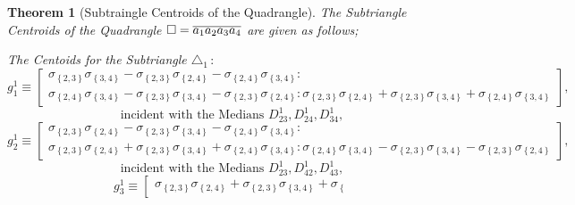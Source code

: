 \documentclass{unswthesis}
\newtheorem{theorem}{Theorem}
\begin{document}
\begin{theorem}[Subtraingle Centroids of the Quadrangle]
The Subtriangle Centroids of the Quadrangle $\square =\overline{%
a_{1}a_{2}a_{3}a_{4}}$ are given as follows;

The Centoids for the Subtriangle $\triangle _{1}\,:$%
\begin{equation*}
g_{1}^{1}\equiv \left[ 
\begin{array}{c}
\sigma _{\left\{ 2,3\right\} }\sigma _{\left\{ 3,4\right\} }-\sigma
_{\left\{ 2,3\right\} }\sigma _{\left\{ 2,4\right\} }-\sigma _{\left\{
2,4\right\} }\sigma _{\left\{ 3,4\right\} }: \\ 
\sigma _{\left\{ 2,4\right\} }\sigma _{\left\{ 3,4\right\} }-\sigma
_{\left\{ 2,3\right\} }\sigma _{\left\{ 3,4\right\} }-\sigma _{\left\{
2,3\right\} }\sigma _{\left\{ 2,4\right\} }:\sigma _{\left\{ 2,3\right\}
}\sigma _{\left\{ 2,4\right\} }+\sigma _{\left\{ 2,3\right\} }\sigma
_{\left\{ 3,4\right\} }+\sigma _{\left\{ 2,4\right\} }\sigma _{\left\{
3,4\right\} }%
\end{array}%
\right] , 
\end{equation*}%
\begin{equation*}
\text{incident with the Medians }D_{23}^{1},D_{24}^{1},D_{34}^{1}, 
\end{equation*}%
\begin{equation*}
g_{2}^{1}\equiv \left[ 
\begin{array}{c}
\sigma _{\left\{ 2,3\right\} }\sigma _{\left\{ 2,4\right\} }-\sigma
_{\left\{ 2,3\right\} }\sigma _{\left\{ 3,4\right\} }-\sigma _{\left\{
2,4\right\} }\sigma _{\left\{ 3,4\right\} }: \\ 
\sigma _{\left\{ 2,3\right\} }\sigma _{\left\{ 2,4\right\} }+\sigma
_{\left\{ 2,3\right\} }\sigma _{\left\{ 3,4\right\} }+\sigma _{\left\{
2,4\right\} }\sigma _{\left\{ 3,4\right\} }:\sigma _{\left\{ 2,4\right\}
}\sigma _{\left\{ 3,4\right\} }-\sigma _{\left\{ 2,3\right\} }\sigma
_{\left\{ 3,4\right\} }-\sigma _{\left\{ 2,3\right\} }\sigma _{\left\{
2,4\right\} }%
\end{array}%
\right] , 
\end{equation*}%
\begin{equation*}
\text{incident with the Medians }D_{23}^{1},D_{42}^{1},D_{43}^{1}, 
\end{equation*}%
\begin{equation*}
g_{3}^{1}\equiv \left[ 
\begin{array}{c}
\sigma _{\left\{ 2,3\right\} }\sigma _{\left\{ 2,4\right\} }+\sigma
_{\left\{ 2,3\right\} }\sigma _{\left\{ 3,4\right\} }+\sigma _{\left\{
}
\end{array}
\end{equation*}
\end{theorem}
\end{document}
